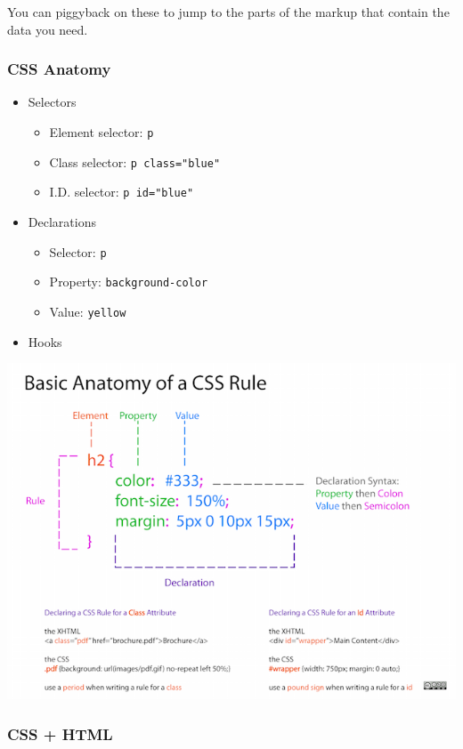 \documentclass[]{book}
\providecommand{\tightlist}{%
  \setlength{\itemsep}{0pt}\setlength{\parskip}{0pt}}
\begin{document}
You can piggyback on these to jump to the parts of the markup that contain the data you need.

\hypertarget{css-anatomy}{%
\subsubsection*{CSS Anatomy}\label{css-anatomy}}

\begin{itemize}
\tightlist
\item
  Selectors

  \begin{itemize}
  \tightlist
  \item
    Element selector: \texttt{p}
  \item
    Class selector: \texttt{p\ class="blue"}
  \item
    I.D. selector: \texttt{p\ id="blue"}
  \end{itemize}
\item
  Declarations

  \begin{itemize}
  \tightlist
  \item
    Selector: \texttt{p}
  \item
    Property: \texttt{background-color}
  \item
    Value: \texttt{yellow}
  \end{itemize}
\item
  Hooks
\end{itemize}

\begin{center}\includegraphics[width=0.7\linewidth]{img/css-rule-2} \end{center}

\hypertarget{css-html}{%
\subsubsection{CSS + HTML}\label{css-html}}
\end{document}
